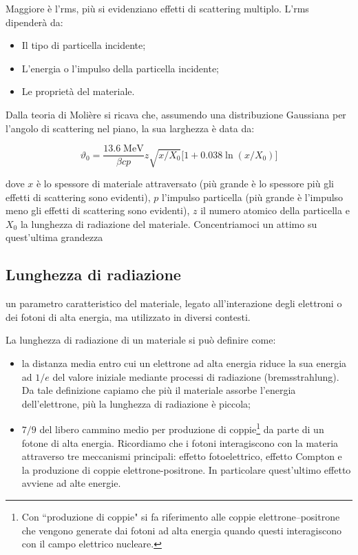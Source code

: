 Maggiore è l'rms, più si evidenziano effetti di scattering multiplo. L'rms dipenderà da:

\begin{itemize}
    \item Il tipo di particella incidente;
    \item L'energia o l'impulso della particella incidente;
    \item Le proprietà del materiale.
\end{itemize}

Dalla teoria di Molière si ricava che, assumendo una distribuzione Gaussiana per l'angolo di scattering nel piano, la sua larghezza è data da:

$$\vartheta_0=\frac{13.6 \; \text{MeV}}{\beta c p} z \sqrt{x/X_0} \big[ 1 + 0.038 \ln(x/X_0) \big]$$

dove $x$ è lo spessore di materiale attraversato (più grande è lo spessore più gli effetti di scattering sono evidenti), $p$ l'impulso particella (più grande è l'impulso meno gli effetti di scattering sono evidenti), $z$ il numero atomico della particella e $X_0$ la lunghezza di radiazione del materiale. Concentriamoci un attimo su quest'ultima grandezza

\subsection{Lunghezza di radiazione}\label{par:lunghezza_di_radiazione}

\E un parametro caratteristico del materiale, legato all'interazione degli elettroni o dei fotoni di alta energia, ma utilizzato in diversi contesti.

La lunghezza di radiazione di un materiale si può definire come:

\begin{itemize}[leftmargin=0.5cm]
    \item la distanza media entro cui un elettrone ad alta energia riduce la sua energia ad $1/e$ del valore iniziale mediante processi di radiazione (bremsstrahlung). Da tale definizione capiamo che più il materiale assorbe l'energia dell'elettrone, più la lunghezza di radiazione è piccola;
    \item $7/9$ del libero cammino medio per produzione di coppie\footnote{Con ``produzione di coppie" si fa riferimento alle coppie elettrone--positrone che vengono generate dai fotoni ad alta energia quando questi interagiscono con il campo elettrico nucleare.} da parte di un fotone di alta energia. Ricordiamo che i fotoni interagiscono con la materia attraverso tre meccanismi principali: effetto fotoelettrico, effetto Compton e la produzione di coppie elettrone-positrone. In particolare quest'ultimo effetto avviene ad alte energie.
\end{itemize}

